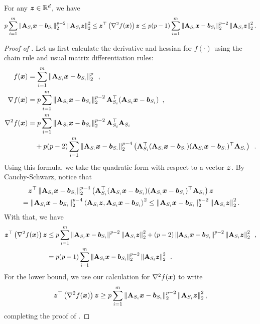 \begin{lemma}
\label{lemma:gp_regression_hessian_upperbound}
For any $\bm{z}\in\mathbb{R}^d$, we have
\begin{align*}
    p\sum_{i=1}^m \left\lVert \mathbf{A}_{S_i}\bm{x}-\bm{b}_{S_i} \right\rVert_2^{p-2}\left\lVert \mathbf{A}_{S_i}\bm{z} \right\rVert_2^2 \le \bm{z}^{\top}\left(\nabla^2 f(\bm{x})\right)\bm{z} \le p(p-1)\sum_{i=1}^m\left\lVert \mathbf{A}_{S_i}\bm{x} - \bm{b}_{S_i} \right\rVert_2^{p-2}\left\lVert \mathbf{A}_{S_i}\bm{z} \right\rVert_2^2.
\end{align*}
\end{lemma}
\begin{proof}[Proof of ]
Let us first calculate the derivative and hessian for $f(\cdot)$ using the chain rule and usual matrix differentiation rules:
\begin{align}
    f(\bm{x}) &= \sum_{i=1}^m\left\lVert \mathbf{A}_{S_i}\bm{x} - \bm{b}_{S_i} \right\rVert_2^p\enspace,\nonumber\\
    \nabla f(\bm{x}) &= p\sum_{i=1}^m \left\lVert \mathbf{A}_{S_i}\bm{x} - \bm{b}_{S_i} \right\rVert_2^{p-2}\mathbf{A}_{S_i}^{\top}(\mathbf{A}_{S_i}\bm{x} - \bm{b}_{S_i})\enspace,\label{eq:f_grad}\\
    \nabla^2 f(\bm{x}) &= p\sum_{i=1}^m\left\lVert \mathbf{A}_{S_i}\bm{x} - \bm{b}_{S_i} \right\rVert_2^{p-2}\mathbf{A}_{S_i}^{\top}\mathbf{A}_{S_i} \nonumber\\
    &\quad + p(p-2)\sum_{i=1}^m\left\lVert \mathbf{A}_{S_i}\bm{x} - \bm{b}_{S_i} \right\rVert_2^{p-4}\left(\mathbf{A}_{S_i}^{\top}(\mathbf{A}_{S_i}\bm{x} - \bm{b}_{S_i})(\mathbf{A}_{S_i}\bm{x} - \bm{b}_{S_i})^{\top}\mathbf{A}_{S_i}\right)\enspace.\label{eq:f_hess}
\end{align}
Using this formula, we take the quadratic form with respect to a vector $\bm{z}$. By Cauchy-Schwarz, notice that
\begin{align*}
    &\quad \bm{z}^{\top}\left\lVert \mathbf{A}_{S_i}\bm{x} - \bm{b}_{S_i} \right\rVert_2^{p-4}\left(\mathbf{A}_{S_i}^{\top}(\mathbf{A}_{S_i}\bm{x} - \bm{b}_{S_i})(\mathbf{A}_{S_i}\bm{x} - \bm{b}_{S_i})^{\top}\mathbf{A}_{S_i}\right)\bm{z} \\
    &= \left\lVert \mathbf{A}_{S_i}\bm{x} - \bm{b}_{S_i} \right\rVert_2^{p-4}\left\langle \mathbf{A}_{S_i}\bm{z}, \mathbf{A}_{S_i}\bm{x}-\bm{b}_{S_i} \right\rangle^2 \le \left\lVert \mathbf{A}_{S_i}\bm{x}-\bm{b}_{S_i} \right\rVert_2^{p-2}\left\lVert \mathbf{A}_{S_i}\bm{z} \right\rVert_2^2.
\end{align*}
With that, we have
\begin{align}
    \bm{z}^{\top}\left(\nabla^2 f(\bm{x})\right)\bm{z} &\le p\sum_{i=1}^m \left\lVert \mathbf{A}_{S_i}\bm{x}-\bm{b}_{S_i} \right\rVert^{p-2}\left\lVert \mathbf{A}_{S_i}\bm{z} \right\rVert_2^2 + (p-2)\left\lVert \mathbf{A}_{S_i}\bm{x}-\bm{b}_{S_i} \right\rVert^{p-2}\left\lVert \mathbf{A}_{S_i}\bm{z} \right\rVert_2^2 \enspace,\nonumber\\
    &= p(p-1)\sum_{i=1}^m\left\lVert \mathbf{A}_{S_i}\bm{x} - \bm{b}_{S_i} \right\rVert_2^{p-2}\left\lVert \mathbf{A}_{S_i}\bm{z} \right\rVert_2^2\enspace.\label{eq:f_quad_form}
\end{align}
For the lower bound, we use our calculation for $\nabla^2 f(\bm{x})$ to write
\begin{align*}
    \bm{z}^{\top}\left(\nabla^2 f(\bm{x})\right)\bm{z} \ge p\sum_{i=1}^m \left\lVert \mathbf{A}_{S_i}\bm{x}-\bm{b}_{S_i} \right\rVert_2^{p-2}\left\lVert \mathbf{A}_{S_i}\bm{z} \right\rVert_2^2,
\end{align*}
completing the proof of .
\end{proof}


